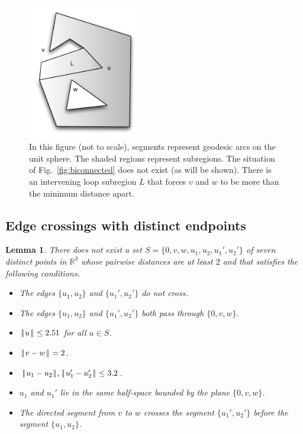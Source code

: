 \documentclass[11pt]{amsart}
\newcommand{\ring}[1]{\mathbb{#1}}
\def\|{{\hskip0.1em|\hskip-0.15em|\hskip0.1em}}
\newtheorem{lemma}{Lemma}
\begin{document}
\begin{figure}
\begin{center}
\includegraphics[width=5cm]{biconnectedloop}
\end{center}
\caption{In this figure (not to scale), segments represent geodesic arcs on the unit sphere.  The shaded regions represent
subregions.   The situation of Fig.~\ref{fig:biconnected} does not exist
(as will be shown).  There is an intervening loop subregion $L$ that forces
$v$ and $w$ to be more than the minimum distance apart.}
\label{fig:biconnectedloop}
\end{figure}


\subsection*{Edge crossings with distinct endpoints}


\begin{lemma}\label{lemma:double-edge} 
There does not exist a set $S=\{0,v,w,u_1,u_2,u_1',u_2'\}$ of seven distinct points
in $\ring{R}^3$ whose pairwise distances are at least $2$ and that satisfies the following conditions.
\begin{itemize}
\item The edges $\{u_1,u_2\}$ and $\{u_1',u_2'\}$ do not cross.
\item The edges $\{u_1,u_2\}$ and $\{u_1',u_2'\}$ both pass through $\{0,v,w\}$.
\item $\|u\|\le 2.51$ for all $u\in S$.
\item $\|v-w\|=2$.
\item $\|u_1-u_2\|,\|u_1'-u_2'\|\le 3.2$.
\item $u_1$ and $u_1'$ lie in the same half-space bounded by the plane $\{0,v,w\}$.
\item The directed segment from $v$ to $w$ crosses the segment $\{u_1',u_2'\}$ before the segment $\{u_1,u_2\}$.
\end{itemize}
\end{lemma}
\end{document}
